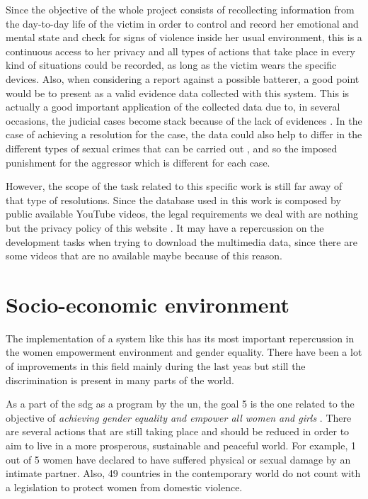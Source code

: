 	Since the objective of the whole project consists of recollecting information from the day-to-day life of the victim in order to control and record her emotional and mental state and check for signs of violence inside her usual environment, this is a continuous access to her privacy and all types of actions that take place in every kind of situations could be recorded, as long as the victim wears the specific devices. Also, when considering a report against a possible batterer, a good point would be to present as a valid evidence data collected with this system. This is actually a good important application of the collected data due to, in several occasions, the judicial cases become stack because of the lack of evidences \cite{UC3M4SafetyTeam2018}. In the case of achieving a resolution for the case, the data could also help to differ in the different types of sexual crimes that can be carried out \cite{Baldwin}, and so the imposed punishment for the aggressor which is different for each case.
	
	However, the scope of the task related to this specific work is still far away of that type of resolutions. Since the database used in this work is composed by public available YouTube videos, the legal requirements we deal with are nothing but the privacy policy of this website \cite{Goetzparterns}. It may have a repercussion on the development tasks when trying to download the multimedia data, since there are some videos that are no available maybe because of this reason. 

\section{Socio-economic environment}
	
	The implementation of a system like this has its most important repercussion in the women empowerment environment and gender equality. There have been a lot of improvements in this field mainly during the last yeas but still the discrimination is present in many parts of the world. 
	
	As a part of the \acrfull{sdg} as a program by the \acrfull{un}, the goal 5 is the one related to the objective of \textit{achieving gender equality and empower all women and girls} \cite{UnitedNations}. There are several actions that are still taking place and should be reduced in order to aim to live in a more prosperous, sustainable and peaceful world. For example, 1 out of 5 women have declared to have suffered physical or sexual damage by an intimate partner. Also, 49 countries in the contemporary world do not count with a legislation to protect women from domestic violence. 
	
